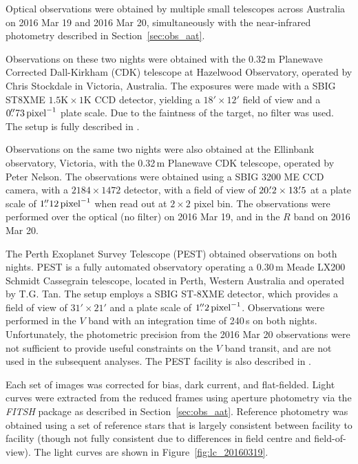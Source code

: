 \documentclass[useAMS,usenatbib]{mn2e}
\begin{document}
Optical observations were obtained by multiple small telescopes across Australia on 2016 Mar 19 and 2016 Mar 20, simultaneously with the near-infrared photometry described in Section~\ref{sec:obs_aat}. 

Observations on these two nights were obtained with the 0.32\,m Planewave Corrected Dall-Kirkham (CDK) telescope at Hazelwood Observatory, operated by Chris Stockdale in Victoria, Australia. The exposures were made with a SBIG ST8XME $1.5\mathrm{K}\times1 \mathrm{K}$ CCD detector, yielding a $18'\times12'$ field of view and a $0\hbox{$.\!\!^{\prime\prime}$}73\,\mathrm{pixel}^{-1}$ plate scale. Due to the faintness of the target, no filter was used. The setup is fully described in \citet{2015arXiv150908953R}.

Observations on the same two nights were also obtained at the Ellinbank observatory, Victoria, with the 0.32\,m Planewave CDK telescope, operated by Peter Nelson. The observations were obtained using a SBIG 3200 ME CCD camera, with a $2184\times1472$ detector, with a field of view of $20\hbox{$.\mkern-4mu^\prime$}2 \times 13\hbox{$.\mkern-4mu^\prime$}5$ at a plate scale of $1\hbox{$.\!\!^{\prime\prime}$}12\,\mathrm{pixel}^{-1}$ when read out at $2\times 2$ pixel bin. The observations were performed over the optical (no filter) on 2016 Mar 19, and in the $R$ band on 2016 Mar 20. 

The Perth Exoplanet Survey Telescope (PEST) obtained observations on both nights. PEST is a fully automated observatory operating a 0.30\,m Meade LX200 Schmidt Cassegrain telescope, located in Perth, Western Australia and operated by T.G. Tan. The setup employs a SBIG ST-8XME detector, which provides a field of view of $31'\times 21'$ and a plate scale of $1\hbox{$.\!\!^{\prime\prime}$}2\,\mathrm{pixel}^{-1}$. Observations were performed in the $V$ band with an integration time of 240\,s on both nights. Unfortunately, the photometric precision from the 2016 Mar 20 observations were not sufficient to provide useful constraints on the $V$ band transit, and are not used in the subsequent analyses. The PEST facility is also described in \citet{2015arXiv150908953R}.

Each set of images was corrected for bias, dark current, and flat-fielded. Light curves were extracted from the reduced frames using aperture photometry via the \emph{FITSH} package as described in Section~\ref{sec:obs_aat}. Reference photometry was obtained using a set of reference stars that is largely consistent between facility to facility (though not fully consistent due to differences in field centre and field-of-view). The light curves are shown in Figure~\ref{fig:lc_20160319}. 
\end{document}
